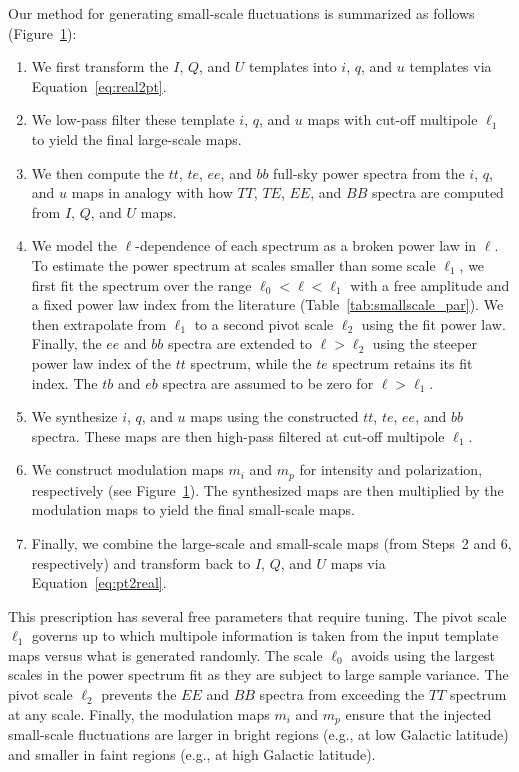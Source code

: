 \documentclass[twocolumn]{aastex631}
\begin{document}
\begin{figure}
    \label{fig:flowchart}
\end{figure}

Our method for generating small-scale fluctuations is summarized as follows (Figure~\ref{fig:flowchart}): 
\begin{enumerate}
    \item We first transform the $I$, $Q$, and $U$ templates into $i$, $q$, and $u$ templates via Equation~\eqref{eq:real2pt}.
    \item We low-pass filter these template $i$, $q$, and $u$ maps with cut-off multipole $\ell_1$ to yield the final large-scale maps.
    \item We then compute the $tt$, $te$, $ee$, and $bb$ full-sky power spectra from the $i$, $q$, and $u$ maps in analogy with how $TT$, $TE$, $EE$, and $BB$ spectra are computed from $I$, $Q$, and $U$ maps.
    \item We model the $\ell$-dependence of each spectrum as a broken power law in $\ell$. To estimate the power spectrum at scales smaller than some scale $\ell_1$, we first fit the spectrum over the range $\ell_0 < \ell < \ell_1$ with a free amplitude and a fixed power law index from the literature (Table~\ref{tab:smallscale_par}). We then extrapolate from $\ell_1$ to a second pivot scale $\ell_2$ using the fit power law. Finally, the $ee$ and $bb$ spectra are extended to $\ell > \ell_2$ using the steeper power law index of the $tt$ spectrum, while the $te$ spectrum retains its fit index. The $tb$ and $eb$ spectra are assumed to be zero for $\ell > \ell_1$.
    \item  We synthesize $i$, $q$, and $u$ maps using the constructed $tt$, $te$, $ee$, and $bb$ spectra. These maps are then high-pass filtered at cut-off multipole $\ell_1$.
    \item We construct modulation maps $m_i$ and $m_p$ for intensity and polarization, respectively (see Figure~\ref{fig:flowchart}). The synthesized maps are then multiplied by the modulation maps to yield the final small-scale maps.
    \item Finally, we combine the large-scale and small-scale maps (from Steps~2 and 6, respectively) and transform back to $I$, $Q$, and $U$ maps via Equation~\eqref{eq:pt2real}.
\end{enumerate}

This prescription has several free parameters that require tuning. The pivot scale $\ell_1$ governs up to which multipole information is taken from the input template maps versus what is generated randomly. The scale $\ell_0$ avoids using the largest scales in the power spectrum fit as they are subject to large sample variance. %
The pivot scale $\ell_2$ prevents the $EE$ and $BB$ spectra from exceeding the $TT$ spectrum at any scale. Finally, the modulation maps $m_i$ and $m_p$ ensure that the injected small-scale fluctuations are larger in bright regions (e.g., at low Galactic latitude) and smaller in faint regions (e.g., at high Galactic latitude).
\end{document}
